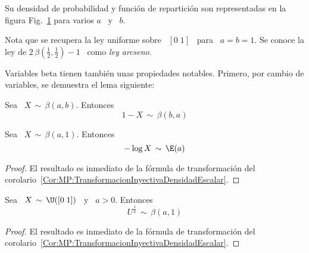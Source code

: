 Su densidad de probabilidad y funci\'on de repartici\'on son representadas en la
figura Fig.~\ref{Fig:MP:Beta} para varios $a$ \ y \ $b$.
%
\begin{figure}[h!]
\begin{center}  \end{center}
%
\label{Fig:MP:Beta}
\end{figure}

Nota que se recupera la  ley uniforme sobre \ $[0 \; 1]$ \  para \ $a = b =
1$. Se conoce la ley de $ 2 \, \beta\left( \frac12 , \frac12 \right) - 1$ \ como
{\em ley arcseno}.

Variables beta  tienen tambi\'en unas propiedades notables.  Primero, por cambio
de variables, se demuestra el lema siguiente:
%
\begin{lema}[Reflexividad]
\label{Lem:MP:ReflexividadBeta}
%
  Sea \ $X \, \sim \, \beta(a,b)$. Entonces
  \[
  1-X \, \sim \, \beta(b,a)
  \]
\end{lema}


\begin{lema}
\label{Lem:MP:VinculoBetaExponencial}
%
  Sea  \   $X  \,  \sim  \,   \beta(a,1)$. Entonces
  \[
  - \log X \, \sim \, \E(a)
  \]
\end{lema}
%
\begin{proof}
  El   resultado  es   inmediato  de   la  f\'ormula   de   transformaci\'on  del
  corolario~\ref{Cor:MP:TransformacionInyectivaDensidadEscalar}.
\end{proof}


\begin{lema}
\label{Lem:MP:VinculoBetaUniforme}
%
  Sea  \   $X  \,  \sim  \,   \U([0 \; 1])$ \ y \ $a > 0$. Entonces
  \[
  U^{\frac{1}{a}} \, \sim \, \beta(a,1)
  \]
\end{lema}
%
\begin{proof}
  El   resultado  es   inmediato  de   la  f\'ormula   de   transformaci\'on  del
  corolario~\ref{Cor:MP:TransformacionInyectivaDensidadEscalar}.
\end{proof}


